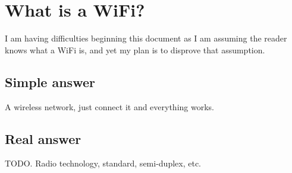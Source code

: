 \documentclass[../wifi-security.tex]{subfiles}
\begin{document}
\section{What is a WiFi?}

I am having difficulties beginning this document as I am assuming the reader knows what a WiFi is, and yet my plan is to disprove that assumption.



\subsection{Simple answer}

A wireless network, just connect it and everything works.

\subsection{Real answer}

TODO. Radio technology, standard, semi-duplex, etc.
\end{document}

